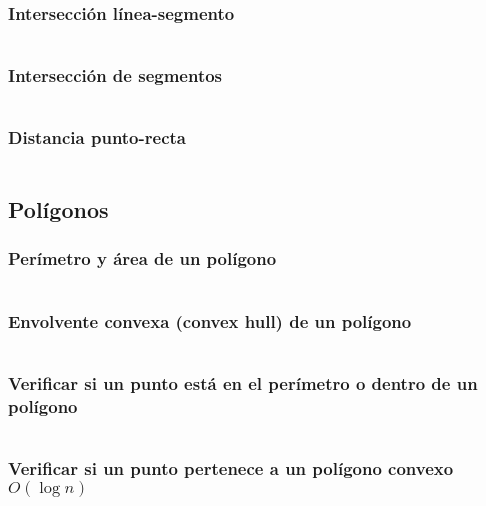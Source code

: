\documentclass[11pt]{article}
\begin{document}
			\subsubsection{Intersección línea-segmento}
			\inputminted[tabsize=2,breaklines,firstline=93,lastline=106,fontsize=\small]{c++}{geometry.cpp}
			
			\subsubsection{Intersección de segmentos}
			\inputminted[tabsize=2,breaklines,firstline=108,lastline=125,fontsize=\small]{c++}{geometry.cpp}
			
			\subsubsection{Distancia punto-recta}
			\inputminted[tabsize=2,breaklines,firstline=127,lastline=130,fontsize=\small]{c++}{geometry.cpp}
			
		\subsection{Polígonos}
			\subsubsection{Perímetro y área de un polígono}
			\inputminted[tabsize=2,breaklines,firstline=132,lastline=148,fontsize=\small]{c++}{geometry.cpp}
			
			\subsubsection{Envolvente convexa (convex hull) de un polígono}
			\inputminted[tabsize=2,breaklines,firstline=150,lastline=169,fontsize=\small]{c++}{geometry.cpp}
			
			\subsubsection{Verificar si un punto está en el perímetro o dentro de un polígono}
			\inputminted[tabsize=2,breaklines,firstline=171,lastline=195,fontsize=\small]{c++}{geometry.cpp}
			
			\subsubsection{Verificar si un punto pertenece a un polígono convexo $O(\log n)$}
			\inputminted[tabsize=2,breaklines,firstline=197,lastline=220,fontsize=\small]{c++}{geometry.cpp}
			
\end{document}
